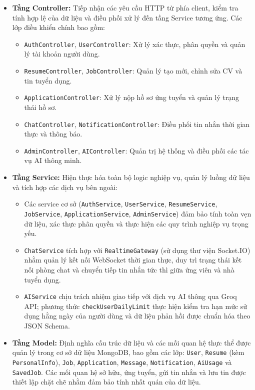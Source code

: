 \begin{itemize}
    \item \textbf{Tầng Controller:} Tiếp nhận các yêu cầu HTTP từ phía client, kiểm tra tính hợp lệ của dữ liệu và điều phối xử lý đến tầng Service tương ứng. Các lớp điều khiển chính bao gồm:
    \begin{itemize}
        \item \texttt{AuthController}, \texttt{UserController}: Xử lý xác thực, phân quyền và quản lý tài khoản người dùng.
        \item \texttt{ResumeController}, \texttt{JobController}: Quản lý tạo mới, chỉnh sửa CV và tin tuyển dụng.
        \item \texttt{ApplicationController}: Xử lý nộp hồ sơ ứng tuyển và quản lý trạng thái hồ sơ.
        \item \texttt{ChatController}, \texttt{NotificationController}: Điều phối tin nhắn thời gian thực và thông báo.
        \item \texttt{AdminController}, \texttt{AIController}: Quản trị hệ thống và điều phối các tác vụ AI thông minh.
    \end{itemize}
    \item \textbf{Tầng Service:} Hiện thực hóa toàn bộ logic nghiệp vụ, quản lý luồng dữ liệu và tích hợp các dịch vụ bên ngoài:
    \begin{itemize}
        \item Các service cơ sở (\texttt{AuthService}, \texttt{UserService}, \texttt{ResumeService}, \texttt{JobService}, \texttt{ApplicationService}, \texttt{AdminService}) đảm bảo tính toàn vẹn dữ liệu, xác thực phân quyền và thực hiện các quy trình nghiệp vụ trọng yếu.
        \item \texttt{ChatService} tích hợp với \texttt{RealtimeGateway} (sử dụng thư viện Socket.IO) nhằm quản lý kết nối WebSocket thời gian thực, duy trì trạng thái kết nối phòng chat và chuyển tiếp tin nhắn tức thì giữa ứng viên và nhà tuyển dụng.
        \item \texttt{AIService} chịu trách nhiệm giao tiếp với dịch vụ AI thông qua Groq API; phương thức \texttt{checkUserDailyLimit} thực hiện kiểm tra hạn mức sử dụng hằng ngày của người dùng và dữ liệu phản hồi được chuẩn hóa theo JSON Schema.
    \end{itemize}
    \item \textbf{Tầng Model:} Định nghĩa cấu trúc dữ liệu và các mối quan hệ thực thể được quản lý trong cơ sở dữ liệu MongoDB, bao gồm các lớp: \texttt{User}, \texttt{Resume} (kèm \texttt{PersonalInfo}), \texttt{Job}, \texttt{Application}, \texttt{Message}, \texttt{Notification}, \texttt{AiUsage} và \texttt{SavedJob}. Các mối quan hệ sở hữu, ứng tuyển, gửi tin nhắn và lưu tin được thiết lập chặt chẽ nhằm đảm bảo tính nhất quán của dữ liệu.
\end{itemize}

